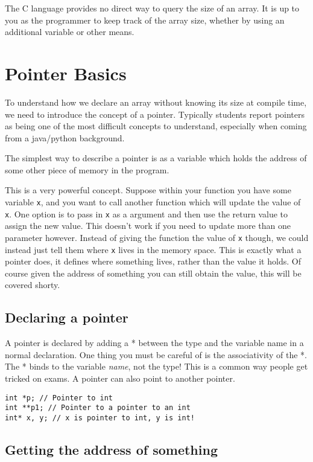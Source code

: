 The C language provides no direct way to query the size of an array.
It is up to you as the programmer to keep track of the array size, whether by using an additional variable or other means.

\section{Pointer Basics}

To understand how we declare an array without knowing its size at compile time, we need to introduce the concept of a pointer.
Typically students report pointers as being one of the most difficult concepts to understand, especially when coming from a java/python background.

The simplest way to describe a pointer is as a variable which holds the address of some other piece of memory in the program.

This is a very powerful concept.
Suppose within your function you have some variable \texttt{x}, and you want to call another function which will update the value of \texttt{x}.
One option is to pass in \texttt{x} as a argument and then use the return value to assign the new value.
This doesn't work if you need to update more than one parameter however.
Instead of giving the function the value of \texttt{x} though, we could instead just tell them where \texttt{x} lives in the memory space.
This is exactly what a pointer does, it defines where something lives, rather than the value it holds. 
Of course given the address of something you can still obtain the value, this will be covered shorty.

\subsection{Declaring a pointer}

A pointer is declared by adding a * between the type and the variable name in a normal declaration.
One thing you must be careful of is the associativity of the *.
The * binds to the variable \emph{name}, not the type!
This is a common way people get tricked on exams.
A pointer can also point to another pointer.

\begin{lstlisting}
int *p; // Pointer to int
int **p1; // Pointer to a pointer to an int
int* x, y; // x is pointer to int, y is int!
\end{lstlisting}

\subsection{Getting the address of something}


